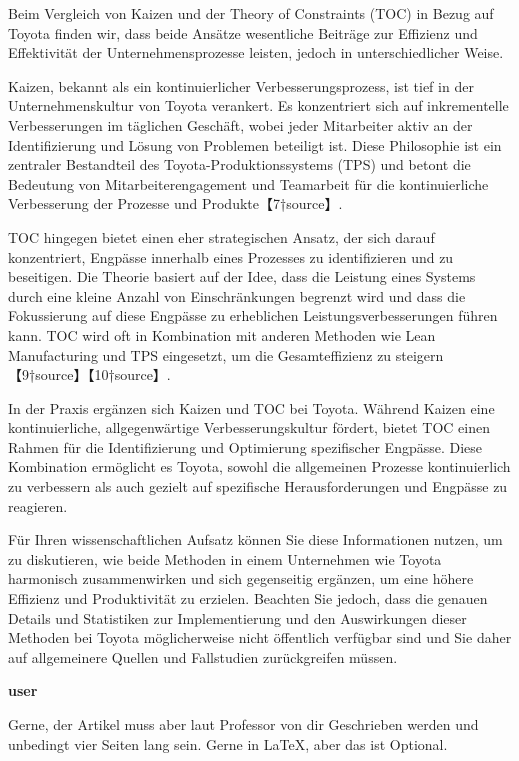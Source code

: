 Beim Vergleich von Kaizen und der Theory of Constraints (TOC) in Bezug auf Toyota finden wir, dass beide Ansätze wesentliche Beiträge zur Effizienz und Effektivität der Unternehmensprozesse leisten, jedoch in unterschiedlicher Weise.

Kaizen, bekannt als ein kontinuierlicher Verbesserungsprozess, ist tief in der Unternehmenskultur von Toyota verankert. Es konzentriert sich auf inkrementelle Verbesserungen im täglichen Geschäft, wobei jeder Mitarbeiter aktiv an der Identifizierung und Lösung von Problemen beteiligt ist. Diese Philosophie ist ein zentraler Bestandteil des Toyota-Produktionssystems (TPS) und betont die Bedeutung von Mitarbeiterengagement und Teamarbeit für die kontinuierliche Verbesserung der Prozesse und Produkte【7†source】.

TOC hingegen bietet einen eher strategischen Ansatz, der sich darauf konzentriert, Engpässe innerhalb eines Prozesses zu identifizieren und zu beseitigen. Die Theorie basiert auf der Idee, dass die Leistung eines Systems durch eine kleine Anzahl von Einschränkungen begrenzt wird und dass die Fokussierung auf diese Engpässe zu erheblichen Leistungsverbesserungen führen kann. TOC wird oft in Kombination mit anderen Methoden wie Lean Manufacturing und TPS eingesetzt, um die Gesamteffizienz zu steigern【9†source】【10†source】.

In der Praxis ergänzen sich Kaizen und TOC bei Toyota. Während Kaizen eine kontinuierliche, allgegenwärtige Verbesserungskultur fördert, bietet TOC einen Rahmen für die Identifizierung und Optimierung spezifischer Engpässe. Diese Kombination ermöglicht es Toyota, sowohl die allgemeinen Prozesse kontinuierlich zu verbessern als auch gezielt auf spezifische Herausforderungen und Engpässe zu reagieren.

Für Ihren wissenschaftlichen Aufsatz können Sie diese Informationen nutzen, um zu diskutieren, wie beide Methoden in einem Unternehmen wie Toyota harmonisch zusammenwirken und sich gegenseitig ergänzen, um eine höhere Effizienz und Produktivität zu erzielen. Beachten Sie jedoch, dass die genauen Details und Statistiken zur Implementierung und den Auswirkungen dieser Methoden bei Toyota möglicherweise nicht öffentlich verfügbar sind und Sie daher auf allgemeinere Quellen und Fallstudien zurückgreifen müssen.

\textbf{user}

Gerne, der Artikel muss aber laut Professor von dir Geschrieben werden und unbedingt vier Seiten lang sein. Gerne in \LaTeX{}, aber das ist Optional. 

